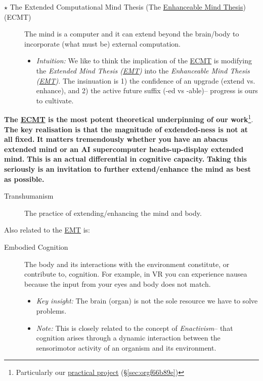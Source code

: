 \documentclass[logo,bsc,singlespacing,parskip]{infthesis}
\begin{document}
{\begin{mdframed}
\begin{description}
\item[{\(\star\) The Extended Computational Mind Thesis (The \hyperref[org865f067]{Enhanceable Mind Thesis}) (\label{orgfeac6f0}ECMT)}] The mind is a computer and it can extend beyond the brain/body to incorporate (what must be) external computation.
\begin{itemize}
\item \emph{Intuition:} We like to think the implication of the \hyperref[orgfeac6f0]{ECMT} is modifying the \emph{Extended Mind Thesis (\hyperref[org1c6a3dd]{EMT})} into the \emph{\label{org865f067}Enhanceable Mind Thesis (\hyperref[org1c6a3dd]{EMT})}.
The insinuation is 1) the confidence of an upgrade (extend vs. enhance), and 2) the active future suffix (-ed vs -able)-- progress is ours to cultivate.
\end{itemize}
\end{description}
\end{mdframed}

\textbf{The \hyperref[orgfeac6f0]{ECMT} is the most potent theoretical underpinning of our work}\footnote{Particularly our \hyperref[sec:orgf66b89e]{practical project} (\S \ref{sec:orgf66b89e})}.
\textbf{The key realisation is that the magnitude of exdended-ness is not at all fixed.}
\textbf{It matters tremendously whether you have an abacus extended mind or an AI supercomputer heads-up-display extended mind.}
\textbf{This is an actual differential in cognitive capacity.}
\textbf{Taking this seriously is an invitation to further extend/enhance the mind as best as possible.}

\begin{mdframed}
\begin{description}
\item[{\label{org5708a5c}Transhumanism}] The practice of extending/enhancing the mind and body.
\end{description}
\end{mdframed}

Also related to the \hyperref[org1c6a3dd]{EMT} is:

\begin{mdframed}
\begin{description}
\item[{\label{orgb456c86}Embodied Cognition}] The body and its interactions with the environment constitute, or contribute to, cognition.
For example, in VR you can experience nausea because the input from your eyes and body does not match.
\begin{itemize}
\item \emph{Key insight:} The brain (organ) is not the sole resource we have to solve problems.
\item \emph{Note:} This is closely related to the concept of \emph{Enactivism}-- that cognition arises through a dynamic interaction between the sensorimotor activity of an organism and its environment.
\end{itemize}
\end{description}
\end{mdframed}

}
\end{document}
